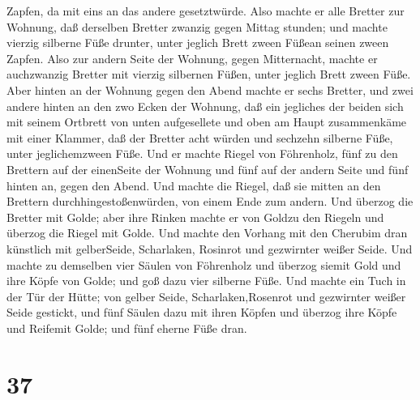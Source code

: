 Zapfen, da mit eins an das andere gesetztwürde. Also machte er alle
Bretter zur Wohnung,  daß derselben Bretter zwanzig gegen
Mittag stunden;  und machte vierzig silberne Füße drunter,
unter jeglich Brett zween Füßean seinen zween Zapfen.  Also
zur andern Seite der Wohnung, gegen Mitternacht, machte er auchzwanzig
Bretter  mit vierzig silbernen Füßen, unter jeglich Brett
zween Füße.  Aber hinten an der Wohnung gegen den Abend
machte er sechs Bretter,  und zwei andere hinten an den zwo
Ecken der Wohnung,  daß ein jegliches der beiden sich mit
seinem Ortbrett von unten aufgesellete und oben am Haupt zusammenkäme
mit einer Klammer,  daß der Bretter acht würden und
sechzehn silberne Füße, unter jeglichemzween Füße.  Und er
machte Riegel von Föhrenholz, fünf zu den Brettern auf der einenSeite
der Wohnung  und fünf auf der andern Seite und fünf hinten
an, gegen den Abend.  Und machte die Riegel, daß sie mitten
an den Brettern durchhingestoßenwürden, von einem Ende zum andern.
 Und überzog die Bretter mit Golde; aber ihre Rinken machte
er von Goldzu den Riegeln und überzog die Riegel mit Golde.
 Und machte den Vorhang mit den Cherubim dran künstlich mit
gelberSeide, Scharlaken, Rosinrot und gezwirnter weißer Seide.
 Und machte zu demselben vier Säulen von Föhrenholz und
überzog siemit Gold und ihre Köpfe von Golde; und goß dazu vier silberne
Füße.  Und machte ein Tuch in der Tür der Hütte; von gelber
Seide, Scharlaken,Rosenrot und gezwirnter weißer Seide gestickt,
 und fünf Säulen dazu mit ihren Köpfen und überzog ihre
Köpfe und Reifemit Golde; und fünf eherne Füße dran.

\hypertarget{section-36}{%
\section{37}\label{section-36}}


